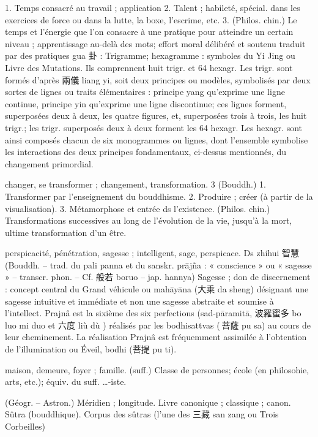 \begin{Def}[gongfu 功夫]
     1. Temps consacré au travail ; application 2. Talent ; habileté, spécial. dans les exercices de force ou dans la lutte, la boxe, l’escrime, etc. 3. (Philos. chin.) Le temps et l’énergie que l’on consacre à une pratique pour atteindre un certain niveau ; apprentissage au-delà des mots; effort moral délibéré et soutenu traduit par des pratiques gua 卦 : Trigramme; hexagramme : symboles du Yi Jing ou Livre des Mutations. Ils comprennent huit trigr. et 64 hexagr. Les trigr. sont formés d’après 兩儀 liang yi, soit deux principes ou modèles, symbolisés par deux sortes de lignes ou traits élémentaires : principe yang qu’exprime une ligne continue, principe yin qu’exprime une ligne discontinue; ces lignes forment, superposées deux à deux, les quatre figures, et, superposées trois à trois, les  huit trigr.; les trigr. superposés deux à deux forment les 64 hexagr. Les hexagr. sont ainsi composés chacun de six monogrammes ou lignes, dont l’ensemble symbolise les interactions des deux principes fondamentaux, ci-dessus mentionnés, du changement primordial.		
\end{Def}

  \begin{Def}[hua 化]
    changer, se transformer ; changement, transformation.   3 (Bouddh.) 1. Transformer par l’enseignement du bouddhisme. 2. Produire ; créer (à partir de la visualisation). 3. Métamorphose et entrée ds l’existence. (Philos. chin.) Transformations successives au long de l’évolution de la vie, jusqu’à la mort, ultime transformation d’un être. 
\end{Def}


\begin{Def}[hui 慧 ]
    perspicacité, pénétration, sagesse ; intelligent, sage, perspicace. Ds zhihui 智慧 (Bouddh. – trad. du pali panna et du sanskr. prājña : « conscience » ou « sagesse » – transcr. phon. – Cf. 般若 boruo – jap. hannya) Sagesse ; don de discernement : concept central du Grand véhicule ou mahāyāna (大乘 da sheng) désignant une sagesse intuitive et immédiate et non une sagesse abstraite et soumise à l’intellect. Prajnâ est la sixième des six perfections (sad-pāramitā, 波羅蜜多 bo luo mi duo et 六度 liù dù ) réalisés par les bodhisattvas ( 菩薩 pu sa) au cours de leur cheminement. La réalisation Prajnâ est fréquemment assimilée à l’obtention de l’illumination ou Éveil, bodhi (菩提 pu ti).
\end{Def}
\begin{Def}[jia 家]
    maison, demeure, foyer ; famille. (suff.) Classe de personnes; école (en philosohie, arts, etc.); équiv. du suff. …-iste. 
\end{Def}
\begin{Def}[jing 經]
    (Géogr. – Astron.) Méridien ; longitude.	Livre canonique ; classique ; canon. Sûtra (bouddhique). Corpus des sûtras (l’une des 三藏 san zang ou Trois Corbeilles)
\end{Def}

